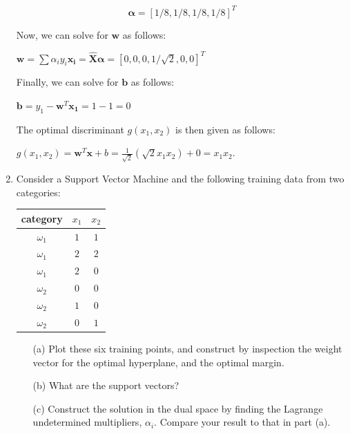 \documentclass[fleqn]{article}
\begin{document}
\begin{enumerate}
	\begin{equation*}
		\boldsymbol{\alpha} = [1/8,1/8,1/8,1/8]^T
	\end{equation*}
	
	Now, we can solve for $\mathbf{w}$ as follows:
	
	$\mathbf{w} = \sum{\alpha_iy_i\mathbf{x_i}} = \boldsymbol{\hat{X}}\boldsymbol{\alpha} = [0,0,0,1/\sqrt{2},0,0]^T$
	
	Finally, we can solve for $\mathbf{b}$ as follows:
	
	$\mathbf{b} = y_1 - \mathbf{w}^T\mathbf{x_1} = 1 - 1 = 0$
	
	The optimal discriminant $g(x_1,x_2)$ is then given as follows:
	
	$g(x_1,x_2) = \mathbf{w}^T\mathbf{x} + b = \frac{1}{\sqrt{2}}(\sqrt{2}x_1x_2) + 0 = x_1x_2$.
	
	\item Consider a Support Vector Machine and the following training data from two categories:
	
	\begin{center}
	\begin{tabular}{| c | c | c |}
		\hline
		category & $x_1$ & $x_2$ \\
		\hline
		$\omega_1$ & $1$ & $1$ \\
		$\omega_1$ & $2$ & $2$ \\
		$\omega_1$ & $2$ & $0$ \\
		\hline
		$\omega_2$ & $0$ & $0$ \\
		$\omega_2$ & $1$ & $0$ \\
		$\omega_2$ & $0$ & $1$ \\
		\hline
	\end{tabular}
	\end{center}
	
	\begin{enumerate}
		\item[(a)] Plot these six training points, and construct by inspection the weight vector for the optimal hyperplane, and the optimal margin.
		
		\item[(b)] What are the support vectors?
		
		\item[(c)] Construct the solution in the dual space by finding the Lagrange undetermined multipliers, $\alpha_i$. Compare your result to that in \newline part (a).
	\end{enumerate}
	\end{enumerate}
\end{document}
